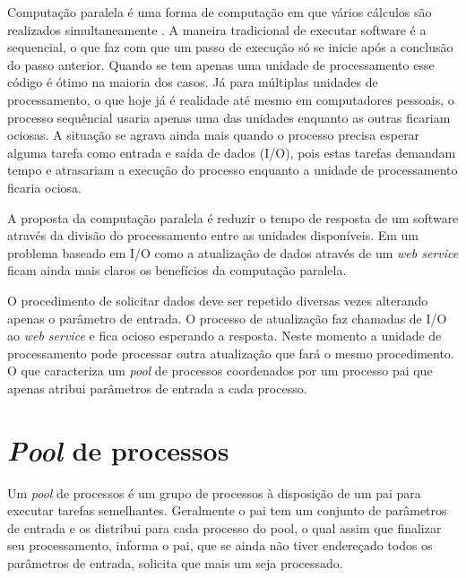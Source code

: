 \label{Cap:computacao_paralela}

Computação paralela é uma forma de computação em que vários cálculos são realizados simultaneamente \cite{ref-computacao-paralela}. A maneira tradicional de executar software é a sequencial, o que faz com que um passo de execução só se inicie após a conclusão do passo anterior. Quando se tem apenas uma unidade de processamento esse código é ótimo na maioria dos casos. Já para múltiplas unidades de processamento, o que hoje já é realidade até mesmo em computadores pessoais, o processo sequêncial usaria apenas uma das unidades enquanto as outras ficariam ociosas. A situação se agrava ainda mais quando o processo precisa esperar alguma tarefa como entrada e saída de dados (I/O), pois estas tarefas demandam tempo e atrasariam a execução do processo enquanto a unidade de processamento ficaria ociosa.

A proposta da computação paralela é reduzir o tempo de resposta de um software através da divisão do processamento entre as unidades disponíveis. Em um problema baseado em I/O como a atualização de dados através de um \textit{web service} ficam ainda mais claros os benefícios da computação paralela.

O procedimento de solicitar dados deve ser repetido diversas vezes alterando apenas o parâmetro de entrada. O processo de atualização faz chamadas de I/O ao \textit{web service} e fica ocioso esperando a resposta. Neste momento a unidade de processamento pode processar outra atualização que fará o mesmo procedimento. O que caracteriza um \textit{pool} de processos coordenados por um processo pai que apenas atribui parâmetros de entrada a cada processo.

\section{\textit{Pool} de processos}

Um \textit{pool} de processos é um grupo de processos à disposição de um pai para executar tarefas semelhantes. Geralmente o pai tem um conjunto de parâmetros de entrada e os distribui para cada processo do pool, o qual assim que finalizar seu processamento, informa o pai, que se ainda não tiver endereçado todos os parâmetros de entrada, solicita que mais um seja processado.
